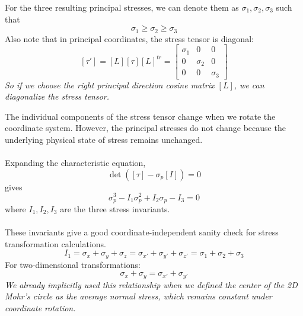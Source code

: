 ﻿\documentclass[12pt]{article}
\begin{document}
For the three resulting principal stresses, we can denote them as $\sigma_1,\sigma_2,\sigma_3$ such that
\[\sigma_1\geq\sigma_2\geq\sigma_3\]
Also note that in principal coordinates, the stress tensor is diagonal:
\[
[\tau']=[L][\tau][L]^{tr}
=\begin{bmatrix}
\sigma_1&0&0\\
0&\sigma_2&0\\
0&0&\sigma_3
\end{bmatrix}
\]
\textit{So if we choose the right principal direction cosine matrix $[L]$, we can diagonalize the stress tensor.}
\begin{notebox}
    The individual components of the stress tensor change when we rotate the coordinate system. However, the principal stresses do not change because the underlying physical state of stress remains unchanged.\\\\
Expanding the characteristic equation,
\[
\det([\tau]-\sigma_p[I])=0
\]
gives
\[
\sigma_p^3-I_1\sigma_p^2+I_2\sigma_p-I_3=0
\]
where \(I_1,I_2,I_3\) are the three stress invariants.\\\\
These invariants give a good coordinate-independent sanity check for stress transformation calculations.
\[
\boxed{I_1=\sigma_x+\sigma_y+\sigma_z
=\sigma_{x'}+\sigma_{y'}+\sigma_{z'}
=\sigma_1+\sigma_2+\sigma_3}
\]
For two-dimensional transformations:
\[
\boxed{\sigma_x+\sigma_y=\sigma_{x'}+\sigma_{y'}}
\]
\textit{We already implicitly used this relationship when we
defined the center of the 2D Mohr's circle as the average
normal stress, which remains constant under coordinate rotation.}
\end{notebox}
\end{document}

